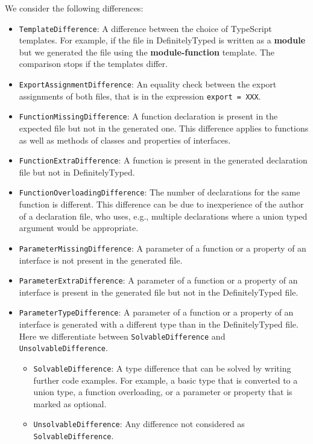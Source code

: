 \documentclass[sigplan,screen]{acmart}
\begin{document}
We consider the following differences:
\begin{itemize}
  \item \texttt{TemplateDifference}: A difference between the choice of TypeScript
    templates. For example, if the file in DefinitelyTyped is written as a \textbf{module}
    but we generated the file using the \textbf{module-function} template. The comparison
    stops if the templates differ. 
  \item \texttt{ExportAssignmentDifference}: An equality check between the export
    assignments of both files, that is in the expression
    \lstinline{export = XXX}.
  \item \texttt{FunctionMissingDifference}: A function declaration is present in the expected
    file but not in the generated one. This difference applies to functions as well as methods of classes
    and properties of interfaces. 
  \item \texttt{FunctionExtraDifference}: A function is present in the generated declaration file but not in DefinitelyTyped.
  \item \texttt{FunctionOverloadingDifference}: The number of declarations for the same
    function is different. This difference can be due to inexperience of the author of a
    declaration file, who uses, e.g., multiple declarations where a union typed argument
    would be appropriate.
  \item \texttt{ParameterMissingDifference}: A parameter of a function or a property of an interface is not present in the generated file.
  \item \texttt{ParameterExtraDifference}: A parameter of a function or a property of an
    interface is present in the generated file but not in the DefinitelyTyped file. 
  \item \texttt{ParameterTypeDifference}: A parameter of a function or a property of an interface is generated with a different type than in the DefinitelyTyped file. Here we differentiate between \texttt{SolvableDifference} and \texttt{UnsolvableDifference}.
  \begin{itemize}
    \item \texttt{SolvableDifference}: A type difference that can be solved by writing
      further code examples. For example, a basic type that is converted to a union type,
      a function overloading, or a parameter or property that is marked as optional. 
    \item \texttt{UnsolvableDifference}: Any difference not considered as \texttt{SolvableDifference}.
  \end{itemize}
\end{itemize}
\end{document}
